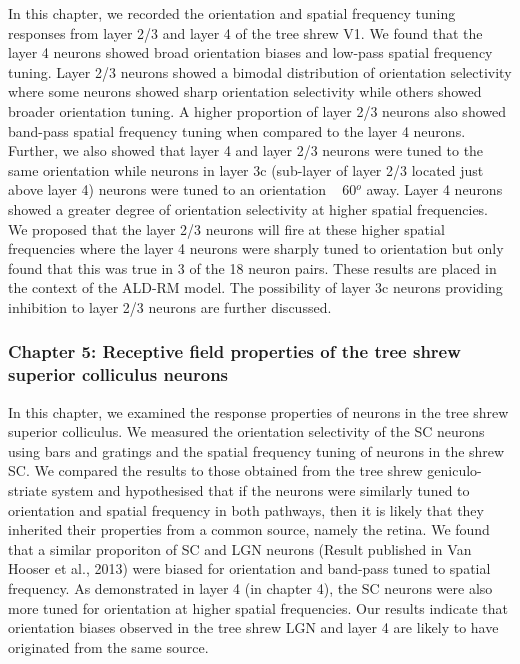 \documentclass [12] {report}
\begin{document}
	In this chapter, we recorded the orientation and spatial frequency tuning responses from layer 2/3 and layer 4 of the tree shrew V1. We found that the layer 4 neurons showed broad orientation biases and low-pass spatial frequency tuning. Layer 2/3 neurons showed a bimodal distribution of orientation selectivity where some neurons showed sharp orientation selectivity while others showed broader orientation tuning. A higher proportion of layer 2/3 neurons also showed band-pass spatial frequency tuning when compared to the layer 4 neurons. Further, we also showed that layer 4 and layer 2/3 neurons were tuned to the same orientation while neurons in layer 3c (sub-layer of layer 2/3 located just above layer 4) neurons were tuned to an orientation ~ 60$^o$ away. Layer 4 neurons showed a greater degree of orientation selectivity at higher spatial frequencies. We proposed that the layer 2/3 neurons will fire at these higher spatial frequencies where the layer 4 neurons were sharply tuned to orientation but only found that this was true in 3 of the 18 neuron pairs. These results are placed in the context of the ALD-RM model. The possibility of layer 3c neurons providing inhibition to layer 2/3 neurons are further discussed.
	
	\subsubsection{Chapter 5: Receptive field properties of the tree shrew superior colliculus neurons}
	
	In this chapter, we examined the response properties of neurons in the tree shrew superior colliculus. We measured the orientation selectivity of the SC neurons using bars and gratings and the spatial frequency tuning of neurons in the shrew SC. We compared the results to those obtained from the tree shrew geniculo-striate system and hypothesised that if the neurons were similarly tuned to orientation and spatial frequency in both pathways, then it is likely that they inherited their properties from a common source, namely the retina. We found that a similar proporiton of SC and LGN neurons (Result published in Van Hooser et al., 2013) were biased for orientation and band-pass tuned to spatial frequency. As demonstrated in layer 4 (in chapter 4), the SC neurons were also more tuned for orientation at higher spatial frequencies. Our results indicate that orientation biases observed in the tree shrew LGN and layer 4 are likely to have originated from the same source.
	
\end{document}
